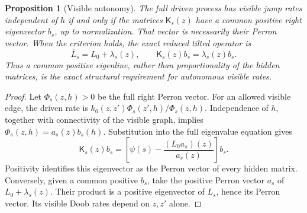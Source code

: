 \documentclass[aps,pre,reprint,amsmath,amssymb,longbibliography,floatfix]{revtex4-2}
\newtheorem{proposition}{Proposition}
\begin{document}
\begin{proposition}[Visible autonomy] The full driven process has visible jump rates
independent of $h$ if and only if the matrices $\mathsf K_s(z)$ have
a common positive right eigenvector $b_s$, up to normalization.
That vector is necessarily their Perron vector. When the criterion
holds, the exact reduced tilted operator is
\begin{equation}
 \overline L_s=L_0+\lambda_s(z),\qquad
 \mathsf K_s(z)b_s=\lambda_s(z)b_s.
 \label{eq:common-line-reduction}
\end{equation}
Thus a common positive eigenline, rather than proportionality of
the hidden matrices, is the exact structural requirement for autonomous
visible rates.

\end{proposition}
\begin{proof} Let $\Phi_s(z,h)>0$ be the full right Perron vector.
For an allowed visible edge, the driven rate is
$k_0(z,z')\Phi_s(z',h)/\Phi_s(z,h)$. Independence of $h$, together
with connectivity of the visible graph, implies
$\Phi_s(z,h)=a_s(z)b_s(h)$. Substitution into the full eigenvalue
equation gives
\begin{equation}
 \mathsf K_s(z)b_s=
 \left[\psi(s)-\frac{(L_0a_s)(z)}{a_s(z)}\right]b_s.
\end{equation}
Positivity identifies this eigenvector as the Perron vector of every
hidden matrix. Conversely, given a common positive $b_s$, take the
positive Perron vector $a_s$ of $L_0+\lambda_s(z)$. Their product is
a positive eigenvector of $L_s$, hence its Perron vector. Its visible
Doob rates depend on $z,z'$ alone. \end{proof}
\end{document}

